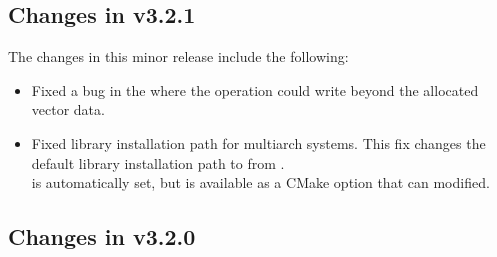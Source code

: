 \subsection*{Changes in v3.2.1}

The changes in this minor release include the following:
\begin{itemize}
\item Fixed a bug in the {\cuda} {\nvector} where the  operation
  could write beyond the allocated vector data.
\item Fixed library installation path for multiarch systems. This fix changes the default
  library installation path to 
  from .\\
   is automatically
  set, but is available as a CMake option that can modified.
\end{itemize}

\subsection*{Changes in v3.2.0}

